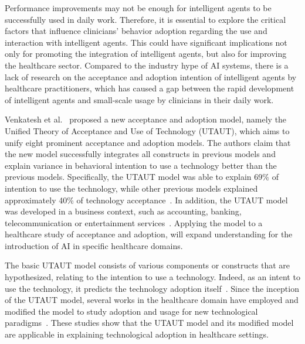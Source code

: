 Performance improvements may not be enough for intelligent agents to be successfully used in daily work.
Therefore, it is essential to explore the critical factors that influence clinicians’ behavior adoption regarding the use and interaction with intelligent agents.
This could have significant implications not only for promoting the integration of intelligent agents, but also for improving the healthcare sector.
Compared to the industry hype of AI systems, there is a lack of research on the acceptance and adoption intention of intelligent agents by healthcare practitioners, which has caused a gap between the rapid development of intelligent agents and small-scale usage by clinicians in their daily work.

Venkatesh et al.~\cite{venkatesh2016unified} proposed a new acceptance and adoption model, namely the Unified Theory of Acceptance and Use of Technology (UTAUT), which aims to unify eight prominent acceptance and adoption models.
The authors claim that the new model successfully integrates all constructs in previous models and explain variance in behavioral intention to use a technology better than the previous models.
Specifically, the UTAUT model was able to explain 69\% of intention to use the technology, while other previous models explained approximately 40\% of technology acceptance~\cite{10.2307/30036540}.
In addition, the UTAUT model was developed in a business context, such as accounting, banking, telecommunication or entertainment services~\cite{KIJSANAYOTIN2009404}.
Applying the model to a healthcare study of acceptance and adoption, will expand understanding for the introduction of AI in specific healthcare domains.

The basic UTAUT model consists of various components or constructs that are hypothesized, relating to the intention to use a technology.
Indeed, as an intent to use the technology, it predicts the technology adoption itself~\cite{DEANGELI2020102412, HART201993, Zhang2022}.
Since the inception of the UTAUT model, several works in the healthcare domain have employed and modified the model to study adoption and usage for new technological paradigms~\cite{KALAVANI2018287}.
These studies show that the UTAUT model and its modified model are applicable in explaining technological adoption in healthcare settings.

